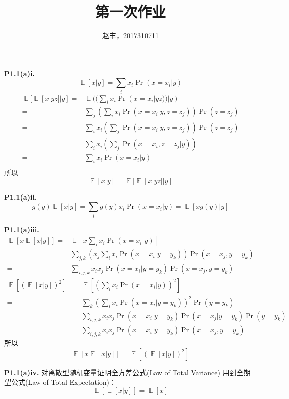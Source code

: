 \documentclass{article}
\DeclareMathOperator{\E}{\mathbb{E}}
\begin{document}
\title{第一次作业}
\author{赵丰，2017310711}
\maketitle
\textbf{P1.1(a)i.}
\begin{equation}
\E[x|y]=\sum_{i} x_i\Pr(x=x_i|y)
\end{equation}
\begin{align*}
\E[\E[x|yz]|y] = & \E((\sum_{i} x_i \Pr(x=x_i| yz))|y)\\
=&\sum_j (\sum_{i} x_i \Pr(x=x_i| y,z=z_j))\Pr(z=z_j) \\
=&\sum_i x_i(\sum_{j} \Pr(x=x_i| y,z=z_j))\Pr(z=z_j) \\
=&\sum_i x_i(\sum_{j} \Pr(x=x_i,z=z_j| y))\\
=&\sum_i x_i \Pr(x=x_i| y) \\
\end{align*}
所以
\begin{equation}
\E[x|y]=\E[\E[x|yz]|y]
\end{equation}

\textbf{P1.1(a)ii.}
\begin{equation}
g(y)\E[x|y]=\sum_{i} g(y)x_i\Pr(x=x_i|y)=\E[xg(y)|y]
\end{equation}

\textbf{P1.1(a)iii.}
\begin{align*}
\E[x\E[x|y]]=&\E\left[x\sum_{i} x_i\Pr(x=x_i|y)\right]\\
=&\sum_{j,k}(x_j\sum_{i} x_i\Pr(x=x_i|y=y_k))\Pr(x=x_j,y=y_k)\\
=&\sum_{i,j,k} x_i x_j \Pr(x=x_i|y=y_k)\Pr(x=x_j,y=y_k)
\end{align*}
\begin{align*}
\E[(\E[x|y])^2]=&\E\left[(\sum_{i} x_i\Pr(x=x_i|y))^2\right]\\
=&\sum_{k}(\sum_{i} x_i\Pr(x=x_i|y=y_k))^2 \Pr(y=y_k)\\
=&\sum_{i,j,k} x_i x_j\Pr(x=x_i|y=y_k)\Pr(x=x_j|y=y_k)\Pr(y=y_k)\\
=&\sum_{i,j,k} x_i x_j\Pr(x=x_i|y=y_k)\Pr(x=x_j,y=y_k)
\end{align*}
所以
\begin{equation}
\E[x\E[x|y]]=\E[(\E[x|y])^2]
\end{equation}

\textbf{P1.1(a)iv.}
对离散型随机变量证明全方差公式(Law of Total Variance)
用到全期望公式(Law of Total Expectation)：
\begin{equation}
\E[\E[x|y]]=\E[x]
\end{equation}
\end{document}
